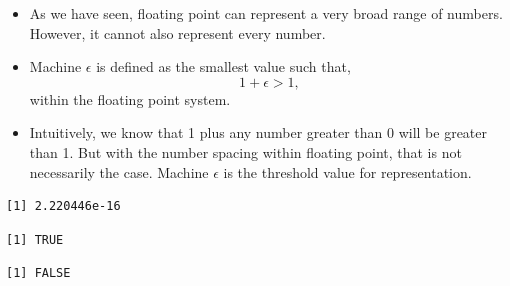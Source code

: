 \documentclass[
  9pt,
  a4paper,
  ignorenonframetext,
  notheorems]{beamer}
\newenvironment{Shaded}{\begin{snugshade}}{\end{snugshade}}
\newcommand{\DecValTok}[1]{\textcolor[rgb]{0.68,0.00,0.00}{#1}}
\newcommand{\NormalTok}[1]{\textcolor[rgb]{0.00,0.23,0.31}{#1}}
\newcommand{\SpecialCharTok}[1]{\textcolor[rgb]{0.37,0.37,0.37}{#1}}
\begin{document}
\begin{frame}[fragile]
\begin{itemize}
\item
  As we have seen, floating point can represent a very broad range of
  numbers. However, it cannot also represent every number.
\item
  Machine \(\epsilon\) is defined as the smallest value such that, \[
  1 + \epsilon > 1,
  \] within the floating point system.
\item
  Intuitively, we know that 1 plus any number greater than 0 will be
  greater than 1. But with the number spacing within floating point,
  that is not necessarily the case. Machine \(\epsilon\) is the
  threshold value for representation.
\end{itemize}

\begin{Shaded}
\end{Shaded}

\begin{verbatim}
[1] 2.220446e-16
\end{verbatim}

\begin{Shaded}
\end{Shaded}

\begin{verbatim}
[1] TRUE
\end{verbatim}

\begin{Shaded}
\end{Shaded}

\begin{verbatim}
[1] FALSE
\end{verbatim}
\end{frame}
\end{document}

